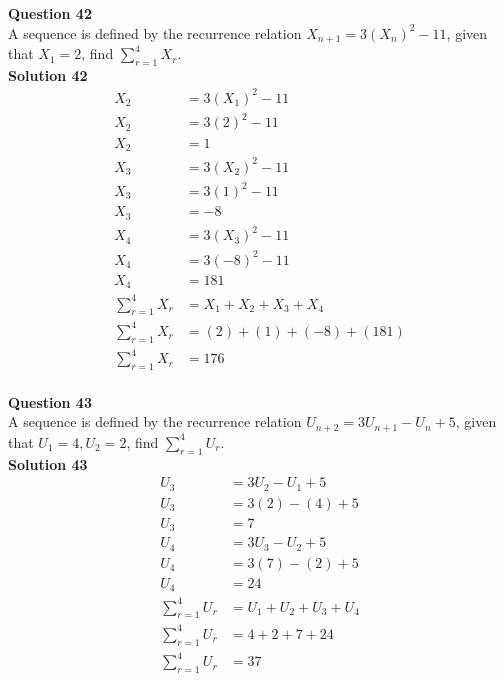 \documentclass{article}
\begin{document}
\noindent\textbf{Question 42}\\[5pt]
A sequence is defined by the recurrence relation $X_{n+1}=3(X_n)^2-11$, given that  $X_1 =2$, find $\displaystyle\sum_{r=1}^{4} X_r$.\\[5pt]
\noindent\textbf{Solution 42}\\[5pt]
\begin{align*}
X_2&=3(X_1)^2-11\\[2pt]
X_2&=3(2)^2-11\\[2pt]
X_2&=1\\[12pt]
X_3&=3(X_2)^2-11\\[2pt]
X_3&=3(1)^2-11\\[2pt]
X_3&=-8\\[12pt]
X_4&=3(X_3)^2-11\\[2pt]
X_4&=3(-8)^2-11\\[2pt]
X_4&=181\\[12pt]
\displaystyle\sum_{r=1}^{4} X_r&=X_1+X_2+X_3+X_4\\[2pt]
\displaystyle\sum_{r=1}^{4} X_r&=(2)+(1)+(-8)+(181)\\[2pt]
\displaystyle\sum_{r=1}^{4} X_r&=176
\end{align*}\\[10pt]

\noindent\textbf{Question 43}\\[5pt]
A sequence is defined by the recurrence relation $U_{n+2}=3U_{n+1}-U_n+5$, given that  $U_1 =4,U_2=2$, find $\displaystyle\sum_{r=1}^{4} U_r$.\\[5pt]
\noindent\textbf{Solution 43}\\[5pt]
\begin{align*}
U_3&=3U_2-U_1+5\\[2pt]
U_3&=3(2)-(4)+5\\[2pt]
U_3&=7\\[12pt]
U_4&=3U_3-U_2+5\\[2pt]
U_4&=3(7)-(2)+5\\[2pt]
U_4&=24\\[12pt]
\displaystyle\sum_{r=1}^{4} U_r&=U_1+U_2+U_3+U_4\\[2pt]
\displaystyle\sum_{r=1}^{4} U_r&=4+2+7+24\\[2pt]
\displaystyle\sum_{r=1}^{4} U_r&=37\\[2pt]
\end{align*}\\[10pt]
\end{document}
